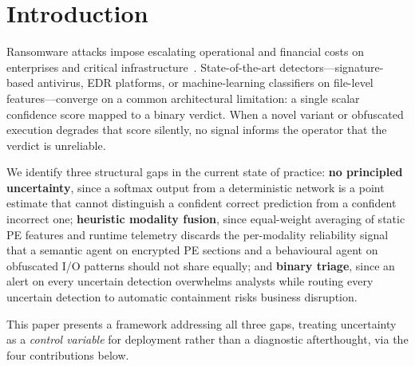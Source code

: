 \documentclass[journal]{IEEEtran}
\begin{document}
\section{Introduction}\label{sec:intro}

Ransomware attacks impose escalating operational and financial costs on
enterprises and critical infrastructure~\cite{beaman2021ransomware}.
State-of-the-art detectors---signature-based antivirus, EDR platforms, or
machine-learning classifiers on file-level features---converge on a common
architectural limitation: a single scalar confidence score mapped to a
binary verdict. When a novel variant or obfuscated execution degrades that
score silently, no signal informs the operator that the verdict is
unreliable.

We identify three structural gaps in the current state of practice:
\textbf{no principled uncertainty}, since a softmax output from a
deterministic network is a point estimate that cannot distinguish a
confident correct prediction from a confident incorrect one;
\textbf{heuristic modality fusion}, since equal-weight averaging of
static PE features and runtime telemetry discards the per-modality
reliability signal that a semantic agent on encrypted PE sections and a
behavioural agent on obfuscated I/O patterns should not share equally;
and \textbf{binary triage}, since an alert on every uncertain detection
overwhelms analysts while routing every uncertain detection to automatic
containment risks business disruption.

This paper presents a framework addressing all three gaps, treating
uncertainty as a \emph{control variable} for deployment rather than a
diagnostic afterthought, via the four contributions below.
\end{document}
